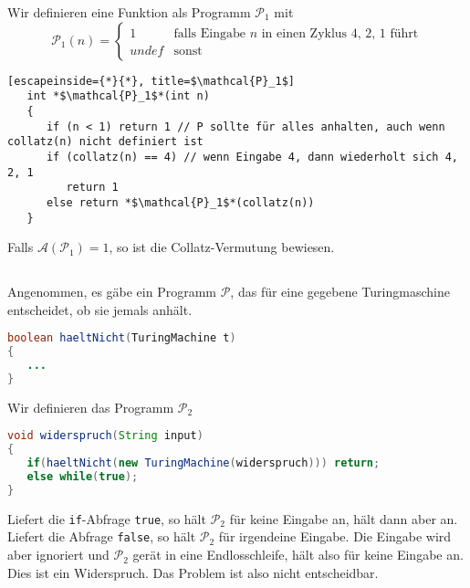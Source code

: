 \documentclass{article}
\begin{document}
Wir definieren eine Funktion als Programm $\mathcal{P}_1$ mit 
\begin{equation*}
   \mathcal{P}_1(n) =
   \begin{cases}
         1 & \text{falls Eingabe $n$ in einen Zyklus 4, 2, 1 führt} \\
         undef & \text{sonst}
      \end{cases}
   \end{equation*}

   \begin{lstlisting}[escapeinside={*}{*}, title=$\mathcal{P}_1$]
   int *$\mathcal{P}_1$*(int n)
   {
      if (n < 1) return 1 // P sollte für alles anhalten, auch wenn collatz(n) nicht definiert ist
      if (collatz(n) == 4) // wenn Eingabe 4, dann wiederholt sich 4, 2, 1
         return 1
      else return *$\mathcal{P}_1$*(collatz(n))
   }
\end{lstlisting}

Falls $\mathcal{A}\left(\mathcal{P}_1\right) = 1$, so ist die Collatz-Vermutung
bewiesen.

\subsection{} 

Angenommen, es gäbe ein Programm $\mathcal{P}$, das für eine gegebene Turingmaschine
entscheidet, ob sie jemals anhält.
\begin{lstlisting}[language=Java,title=$\mathcal{P}$]
boolean haeltNicht(TuringMachine t)
{
   ...
}
\end{lstlisting}

Wir definieren das Programm $\mathcal{P}_2$
\begin{lstlisting}[language=Java,title=$\mathcal{P}_2$]
void widerspruch(String input)
{
   if(haeltNicht(new TuringMachine(widerspruch))) return;
   else while(true);
}
\end{lstlisting}

Liefert die \texttt{if}-Abfrage \texttt{true}, so hält $\mathcal{P}_2$ für keine
Eingabe an, hält dann aber an. Liefert die Abfrage \texttt{false}, so hält
$\mathcal{P}_2$ für irgendeine Eingabe. Die Eingabe wird aber ignoriert und
$\mathcal{P}_2$ gerät in eine Endlosschleife, hält also für keine Eingabe an.
Dies ist ein Widerspruch. Das Problem ist also nicht entscheidbar.

\subsection{} 
\end{document}
